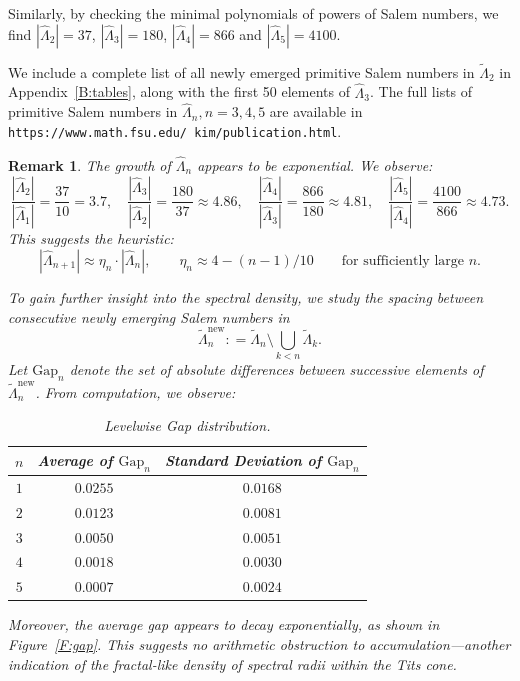 \documentclass[11pt]{amsart}
\numberwithin{equation}{section}
\newtheorem{rem}[thm]{Remark}
\begin{document}
Similarly, by checking the minimal polynomials of powers of Salem numbers, we find \(|\hat \Lambda_2| = 37\), \(|\hat \Lambda_3| = 180\),  \(|\hat \Lambda_4| = 866\) and  \(|\hat \Lambda_5| = 4100\). 

\vspace{1ex}
We include a complete list of all newly emerged primitive Salem numbers
in \(\tilde \Lambda_2\) in Appendix~\ref{B:tables}, along with the first 50 elements of \(\hat \Lambda_3\). The full lists of primitive Salem numbers in $\hat \Lambda_n, n=3,4,5$ are available in \texttt{https://www.math.fsu.edu/~kim/publication.html}.

\begin{rem}
The growth of \(\hat \Lambda_n\) appears to be exponential.
We observe:
\[
\frac{|\hat \Lambda_2|}{|\hat \Lambda_1|} = \frac{37}{10} = 3.7,
\quad
\frac{|\hat \Lambda_3|}{|\hat \Lambda_2|} = \frac{180}{37} \approx 4.86,
\quad
\frac{|\hat \Lambda_4|}{|\hat \Lambda_3|} = \frac{866}{180} \approx 4.81,
\quad
\frac{|\hat \Lambda_5|}{|\hat \Lambda_4|} = \frac{4100}{866} \approx 4.73.
\]
This suggests the heuristic:
\[
|\hat \Lambda_{n+1}| \approx \eta_n \cdot |\hat \Lambda_n|, \qquad \eta_n \approx 4-(n-1)/10
\qquad \text{for sufficiently large } n.
\]

\medskip
To gain further insight into the spectral density, we study the spacing
between consecutive newly emerging Salem numbers in
\[ \tilde \Lambda_n^\text{new} : = \tilde \Lambda_n \setminus \bigcup_{k<n} \tilde \Lambda_k.\]
Let \(\mathrm{Gap}_n\) denote the set of absolute differences between
successive elements of \(\tilde \Lambda_n^\text{new}\).
From computation, we observe:

\begin{table}[h]
\centering
\begin{tabular}{|c|c|c|}
\hline
$n$ & Average of $\mathrm{Gap}_n$& Standard Deviation of $\mathrm{Gap}_n$ \\ \hline\hline
$1$ & $0.0255$ & $0.0168$\\ \hline
$2$ & $0.0123$ & $0.0081$\\ \hline
$3$ & $0.0050$ & $0.0051$\\ \hline
$4$ & $0.0018$ & $0.0030$\\ \hline
$5$ & $0.0007$ & $0.0024$\\ \hline
\end{tabular}
\caption{Levelwise Gap distribution.}
\label{T:GapDis}
\end{table}
%
%
Moreover, the average gap appears to decay exponentially, as shown
in Figure~\ref{F:gap}. This suggests no arithmetic obstruction to
accumulation---another indication of the fractal-like density of
spectral radii within the Tits cone.

\end{rem}
\end{document}
